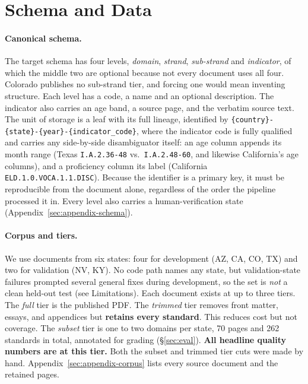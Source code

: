 \documentclass[11pt]{article}
\begin{document}
\section{Schema and Data}
\label{sec:data}\label{sec:corpus}\label{sec:schema}

\paragraph{Canonical schema.} The target schema has four levels,
\emph{domain}, \emph{strand}, \emph{sub-strand} and \emph{indicator}, of which
the middle two are optional because not every document uses all four. Colorado publishes no sub-strand tier, and forcing one would mean inventing structure. Each level has a code, a name and an optional description.
The indicator also carries an age band, a source page, and the verbatim source
text. The unit of storage is a leaf with its full lineage, identified by
\texttt{\{country\}-\{state\}-\{year\}-\{indicator\_code\}}, where the indicator
code is fully qualified and carries any side-by-side disambiguator itself:
an age column appends its month range (Texas \texttt{I.A.2.36-48} vs.\
\texttt{I.A.2.48-60}, and likewise California's age columns), and a
proficiency column its label (California \texttt{ELD.1.0.VOCA.1.1.DISC}). Because the identifier is a primary key, it must be reproducible from the document alone, regardless of the order the pipeline processed it in. Every level also carries a human-verification state
(Appendix~\ref{sec:appendix-schema}).

\paragraph{Corpus and tiers.} We use documents from six states: four for development (AZ, CA, CO, TX) and two for validation (NV, KY). No code path names any state, but validation-state failures prompted several general fixes during development, so the set is \emph{not} a clean held-out test (see Limitations). Each document exists at up to three tiers. The \emph{full} tier is the published PDF. The \emph{trimmed} tier removes front matter, essays, and appendices but \textbf{retains every standard}. This reduces cost but not coverage. The \emph{subset} tier is one to two domains per state, 70 pages and 262 standards in total, annotated for grading (\S\ref{sec:eval}). \textbf{All headline quality numbers are at this tier.} Both the subset and trimmed tier cuts were made by hand. Appendix~\ref{sec:appendix-corpus} lists every source document and the retained pages.
\end{document}
